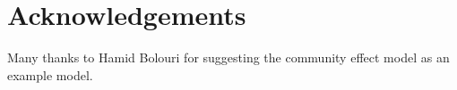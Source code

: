 \documentclass{cekarticle}
\begin{document}
\begin{example}
\end{example}

\section{Acknowledgements}

Many thanks to Hamid Bolouri for suggesting the community effect model as an example model.




\end{document}
